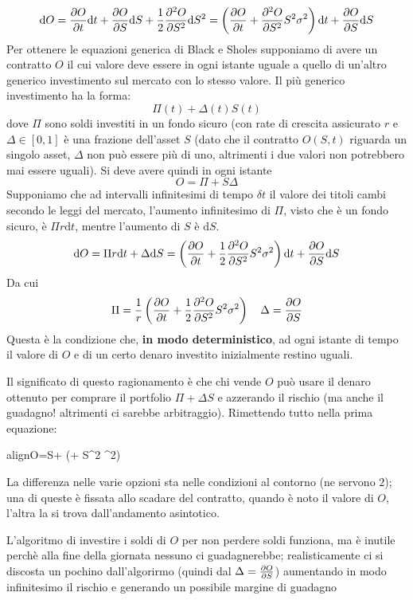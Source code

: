 \documentclass[a4paper,12pt]{article}
\newcommand{\boxedeq}[2]{\begin{empheq}[box={\fboxsep=6pt\fbox}]{align}\label{#1}#2\end{empheq}}
\theoremstyle{plain}
\theoremstyle{definition}
\newcommand{\f}[2]{\frac{#1}{#2}}
\renewcommand{\d}{\text{d}}
\theoremstyle{remark}
\begin{document}
\[\d O= \pdv{O}{t}\d t +\pdv{O}{S} \d S+\f{1}{2}\pdv[2]{O}{S} \d S^2= \left(\pdv{O}{t}+\pdv[2]{O}{S} S^2 \sigma^2\right)\d t +\pdv{O}{S}  \d S		\]
Per ottenere le equazioni generica di Black e Sholes supponiamo di avere un contratto $O$ il cui valore deve essere in ogni istante uguale a quello di un'altro generico investimento sul mercato con lo stesso valore. Il più generico investimento ha la forma:
\[\Pi(t)+\Delta(t) S(t)		\]
dove $\Pi $ sono soldi investiti in un fondo sicuro (con rate di crescita assicurato $r$ e $\Delta\in[0,1]$ è una frazione dell'asset $S$ (dato che il contratto $O(S,t)$ riguarda un singolo asset, $\Delta$ non può essere più di uno, altrimenti i due valori non potrebbero mai essere uguali).
Si deve avere quindi in ogni istante 
\[O=\Pi+ S\Delta 		\]
Supponiamo che ad intervalli infinitesimi di tempo $\delta t$ il valore dei titoli cambi secondo le leggi del mercato, l'aumento infinitesimo di $\Pi$, visto che è un fondo sicuro, è $\Pi r \d t$, mentre l'aumento di $S$ è $\d S$.
\[\d O=	\Pi r \d t+\Delta \d S=\left(\pdv{O}{t}+\f{1}{2}\pdv[2]{O}{S} S^2 \sigma^2\right)\d t +\pdv{O}{S}  \d S	\]
Da cui 
\[\Pi =\f{1}{r}	\left(\pdv{O}{t}+\f{1}{2}\pdv[2]{O}{S} S^2 \sigma^2\right)	\quad \Delta=\pdv{O}{S}  	\]
Questa è la condizione che, \textbf{in modo deterministico}, ad ogni istante di tempo il valore di $O$ e di un certo denaro investito inizialmente restino uguali.

Il significato di questo ragionamento è che chi vende $O$ può usare il denaro ottenuto per comprare il portfolio $\Pi+\Delta S$ e azzerando il rischio (ma anche il guadagno! altrimenti ci sarebbe arbitraggio).
Rimettendo tutto nella prima equazione:
\boxedeq{BS}{O=S+\f{1}{r}	\left(+\f{1}{2}\pdv[2]{O}{S} S^2 \sigma^2\right)}
La differenza nelle varie opzioni sta nelle condizioni al contorno (ne servono $2$); una di queste è fissata allo scadare del contratto, quando è noto il valore di $O$, l'altra la si trova dall'andamento asintotico.
\begin{obs}
L'algoritmo di investire i soldi di $O$ per non perdere soldi funziona, ma è inutile perchè alla fine della giornata nessuno ci guadagnerebbe; realisticamente ci si discosta un pochino dall'algorirmo (quindi dal $\Delta=\pdv{O}{S}$) aumentando in modo infinitesimo il rischio e generando un possibile margine di guadagno
\end{obs}
\end{document}
